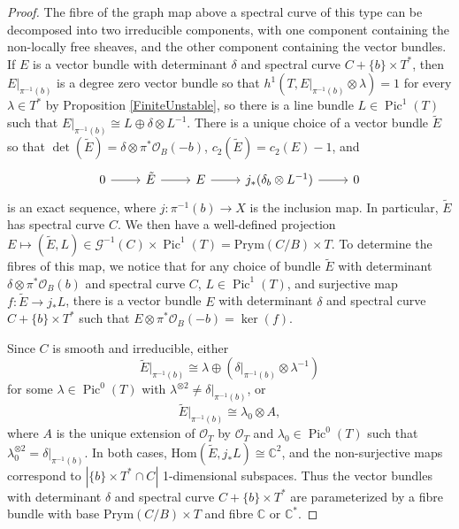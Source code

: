 \documentclass{article}[12pt]
\theoremstyle{definition}
\theoremstyle{remark}
\newcommand \C{\mathbb C}
\numberwithin{equation}{section}
\newcommand \mc{\mathcal}
\DeclareMathOperator{\Pic}{Pic}
\begin{document}
\begin{proof}
	The fibre of the graph map above a spectral curve of this type can be decomposed into two irreducible components, with one component containing the non-locally free sheaves, and the other component containing the vector bundles. If $E$ is a vector bundle with determinant $\delta$ and spectral curve $C+\{b\}\times T^*$, then $E|_{\pi^{-1}(b)}$ is a degree zero vector bundle so that $h^1(T,E|_{\pi^{-1}(b)}\otimes \lambda)=1$ for every $\lambda \in T^*$ by Proposition \ref{FiniteUnstable}, so there is a line bundle $L \in \Pic^1(T)$ such that $E|_{\pi^{-1}(b)}\cong L\oplus \delta\otimes L^{-1}$. There is a unique choice of a vector bundle $\tilde{E}$ so that $\det(\tilde{E})=\delta\otimes \pi^* \mc{O}_B(-b)$, $c_2(\tilde{E})=c_2(E)-1$, and
	$$\begin{tikzcd}
		0 \arrow[r] &\tilde{E} \arrow[r] & E \arrow[r] & j_*(\delta_b\otimes L^{-1})\arrow[r] &0
	\end{tikzcd}$$
	is an exact sequence, where $j:\pi^{-1}(b)\to X$ is the inclusion map. In particular, $\tilde{E}$ has spectral curve $C$. We then have a well-defined projection $E\mapsto (\tilde{E}, L)\in \mc{G}^{-1}(C)\times \Pic^1(T)=\text{Prym}(C/B)\times T$. To determine the fibres of this map, we notice that for any choice of bundle $\tilde{E}$ with determinant $\delta\otimes \pi^*\mc{O}_B(b)$ and spectral curve $C$, $L \in \Pic^1(T)$, and  surjective map $f:\tilde{E}\to j_*L$, there is a vector bundle $E$ with determinant $\delta$ and spectral curve $C+\{b\}\times T^*$ 
	such that $E\otimes \pi^*\mc{O}_B(-b)=\ker(f)$. 
	
	Since $C$ is smooth and irreducible, either $$\tilde{E}|_{\pi^{-1}(b)}\cong \lambda\oplus (\delta|_{\pi^{-1}(b)}\otimes \lambda^{-1})$$ for some $\lambda \in \Pic^0(T)$ with $\lambda^{\otimes 2}\neq \delta|_{\pi^{-1}(b)}$, or $$\tilde{E}|_{\pi^{-1}(b)}\cong \lambda_0\otimes A,$$ where $A$ is the unique extension of $\mc{O}_T$ by $\mc{O}_T$ and $\lambda_0 \in \Pic^0(T)$ such that $\lambda_0^{\otimes 2}=\delta|_{\pi^{-1}(b)}$. In both cases, $\text{Hom}(\tilde{E}, j_*L)\cong \C^2$, and the non-surjective maps correspond to $|\{b\}\times T^* \cap C|$ 1-dimensional subspaces. Thus the vector bundles with determinant $\delta$ and spectral curve $C+\{b\}\times T^*$ are parameterized by a fibre bundle with base $\text{Prym}(C/B)\times T$ and fibre $\C$ or $\C^*$.
	

\end{proof}
\end{document}
